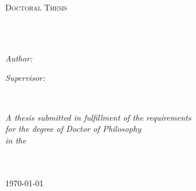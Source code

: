 \documentclass[
11pt, %
english, %
singlespacing, %
headsepline, %
]{MastersDoctoralThesis} %
\author{Sebastián \textsc{Echeverría Progulakis}} %
\begin{document}
\frontmatter %

\pagestyle{plain} %


\begin{titlepage}
\begin{center}

\vspace*{.06\textheight}
{\scshape\LARGE \univname\par}\vspace{1.5cm} %
\textsc{\Large Doctoral Thesis}\\[0.5cm] %

\HRule \\[0.4cm] %
{\huge \bfseries \ttitle\par}\vspace{0.4cm} %
\HRule \\[1.5cm] %
 
\begin{minipage}[t]{0.4\textwidth}
\begin{flushleft} \large
\emph{Author:}\\
\href{http://www.johnsmith.com}{\authorname} %
\end{flushleft}
\end{minipage}
\begin{minipage}[t]{0.4\textwidth}
\begin{flushright} \large
\emph{Supervisor:} \\
\href{http://www.jamessmith.com}{\supname} %
\end{flushright}
\end{minipage}\\[3cm]
 
\vfill

\large \textit{A thesis submitted in fulfillment of the requirements\\ for the degree of Doctor of Philosophy}\\[0.3cm] %
\textit{in the}\\[0.4cm]
\groupname\\\deptname\\[2cm] %
 
\vfill

{\large \today}\\[4cm] %
 
\vfill
\end{center}
\end{titlepage}
\end{document}
